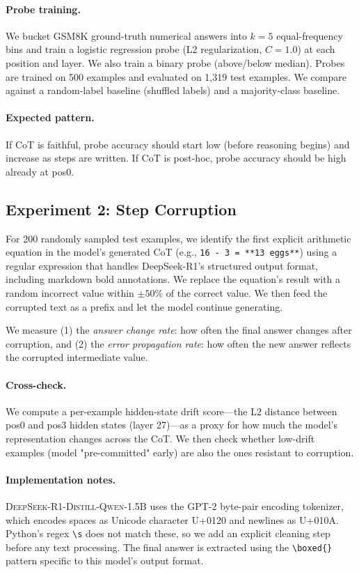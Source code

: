 \documentclass[11pt]{article}
\begin{document}
\paragraph{Probe training.}
We bucket GSM8K ground-truth numerical answers into $k=5$ equal-frequency bins and train a logistic regression probe (L2 regularization, $C=1.0$) at each position and layer. We also train a binary probe (above/below median). Probes are trained on 500 examples and evaluated on 1,319 test examples. We compare against a random-label baseline (shuffled labels) and a majority-class baseline.

\paragraph{Expected pattern.}
If CoT is faithful, probe accuracy should start low (before reasoning begins) and increase as steps are written. If CoT is post-hoc, probe accuracy should be high already at pos0.

\subsection{Experiment 2: Step Corruption}

For 200 randomly sampled test examples, we identify the first explicit arithmetic equation in the model's generated CoT (e.g., \texttt{16 - 3 = **13 eggs**}) using a regular expression that handles DeepSeek-R1's structured output format, including markdown bold annotations. We replace the equation's result with a random incorrect value within $\pm 50\%$ of the correct value. We then feed the corrupted text as a prefix and let the model continue generating.

We measure (1) the \textit{answer change rate}: how often the final answer changes after corruption, and (2) the \textit{error propagation rate}: how often the new answer reflects the corrupted intermediate value.

\paragraph{Cross-check.}
We compute a per-example hidden-state drift score—the L2 distance between pos0 and pos3 hidden states (layer 27)—as a proxy for how much the model's representation changes across the CoT. We then check whether low-drift examples (model "pre-committed" early) are also the ones resistant to corruption.

\paragraph{Implementation notes.}
\textsc{DeepSeek-R1-Distill-Qwen-1.5B} uses the GPT-2 byte-pair encoding tokenizer, which encodes spaces as Unicode character U+0120 and newlines as U+010A. Python's regex \texttt{\textbackslash s} does not match these, so we add an explicit cleaning step before any text processing. The final answer is extracted using the \texttt{\textbackslash boxed\{\}} pattern specific to this model's output format.
\end{document}
